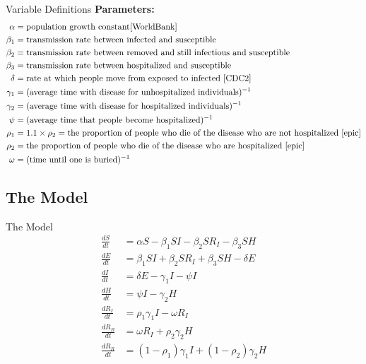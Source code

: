 \documentclass{beamer}
\begin{document}
\begin{frame}{Variable Definitions}
\textbf{Parameters:} 
\scriptsize
\begin{align*}
\alpha &= \text{population growth constant} \cite{WorldBank} \\
\beta_1 &= \text{transmission rate between infected and susceptible} \\
\beta_2	&= \text{transmission rate between removed and still infectious and susceptible} \\
\beta_3 &= \text{transmission rate between hospitalized and susceptible}\\
\delta &= \text{rate at which people move from exposed to infected}\ \cite{CDC2} \\
\gamma_1 &= (\text{average time with disease for unhospitalized individuals} )^{-1}\\
\gamma_2 &= (\text{average time with disease for hospitalized individuals} )^{-1}\\
\psi &= (\text{average time that people become hospitalized})^{-1}\\
\rho_1 &= 1.1\times \rho_2 = \text{the proportion of people who die of the disease who are not hospitalized}\ \cite{epic} \\
\rho_2   &= \text{the proportion of people who die of the disease who are hospitalized}\ \cite{epic} \\
\omega  &= (\text{time until one is buried})^{-1}
\end{align*}
\end{frame}

\subsection{The Model}

\begin{frame}{The Model}
\begin{align*} 
\frac{dS}{dt} &= \alpha S - \beta_1 S I -\beta_2 S R_I -\beta_3SH\\
\frac{dE}{dt} &=  \beta_1 S I +\beta_2 S R_I +\beta_3SH- \delta E \\
\frac{dI}{dt} &=  \delta E - \gamma_1 I-\psi I\\
\frac{dH}{dt} &= \psi I - \gamma_2 H \\ 
\frac{dR_I}{dt} &= \rho_1\gamma_1 I - \omega R_I \\
\frac{dR_B}{dt} &= \omega R_I+\rho_2\gamma_2 H \\ 
\frac{dR_R}{dt} &= (1-\rho_1)\gamma_1 I+(1-\rho_2)\gamma_2 H \\
\end{align*}

\end{frame}
\end{document}
